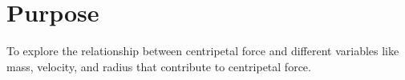 
\section{Purpose}
\vspace{-0.5cm}
\singlespacing
To explore the relationship between centripetal force and different variables like mass, velocity, and radius that contribute to centripetal force.
